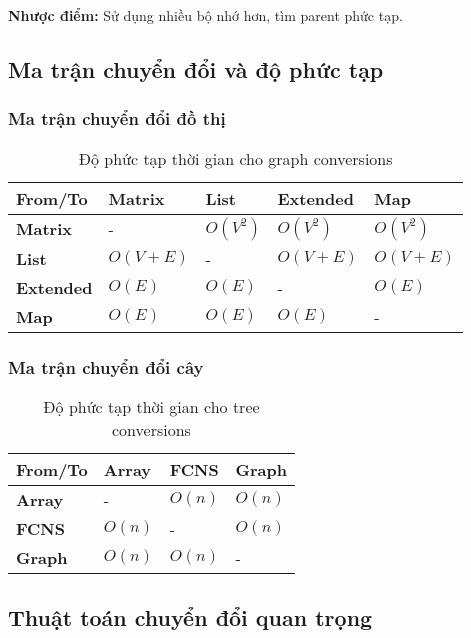 \documentclass[12pt]{article}
\begin{document}
\textbf{Nhược điểm:} Sử dụng nhiều bộ nhớ hơn, tìm parent phức tạp.

\subsection*{Ma trận chuyển đổi và độ phức tạp}

\subsubsection*{Ma trận chuyển đổi đồ thị}
\begin{table}[H]
\centering
\footnotesize
\begin{tabular}{|l|l|l|l|l|}
\hline
\textbf{From/To} & \textbf{Matrix} & \textbf{List} & \textbf{Extended} & \textbf{Map} \\
\hline
\textbf{Matrix} & - & $O(V^2)$ & $O(V^2)$ & $O(V^2)$ \\
\textbf{List} & $O(V + E)$ & - & $O(V + E)$ & $O(V + E)$ \\
\textbf{Extended} & $O(E)$ & $O(E)$ & - & $O(E)$ \\
\textbf{Map} & $O(E)$ & $O(E)$ & $O(E)$ & - \\
\hline
\end{tabular}
\caption{Độ phức tạp thời gian cho graph conversions}
\end{table}

\subsubsection*{Ma trận chuyển đổi cây}
\begin{table}[H]
\centering
\footnotesize
\begin{tabular}{|l|l|l|l|}
\hline
\textbf{From/To} & \textbf{Array} & \textbf{FCNS} & \textbf{Graph} \\
\hline
\textbf{Array} & - & $O(n)$ & $O(n)$ \\
\textbf{FCNS} & $O(n)$ & - & $O(n)$ \\
\textbf{Graph} & $O(n)$ & $O(n)$ & - \\
\hline
\end{tabular}
\caption{Độ phức tạp thời gian cho tree conversions}
\end{table}

\subsection*{Thuật toán chuyển đổi quan trọng}
\end{document}
